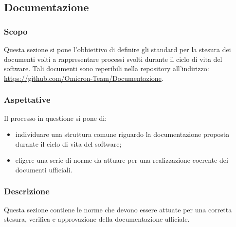 \subsection{Documentazione}\label{3.1}

\subsubsection{Scopo}\label{3.1.1}
Questa sezione si pone l'obbiettivo di definire gli standard per la stesura dei documenti volti a rappresentare processi svolti durante il ciclo di vita del software. Tali documenti sono reperibili nella repository all'indirizzo: \url{https://github.com/Omicron-Team/Documentazione}.

\subsubsection{Aspettative}
Il processo in questione si pone di:
\begin{itemize}
\item individuare una struttura comune riguardo la documentazione proposta durante il ciclo di vita del software;
\item eligere una serie di norme da attuare per una realizzazione coerente dei documenti ufficiali.
\end{itemize}

\subsubsection{Descrizione}
Questa sezione contiene le norme che devono essere attuate per una corretta stesura, verifica e approvazione della documentazione ufficiale.

